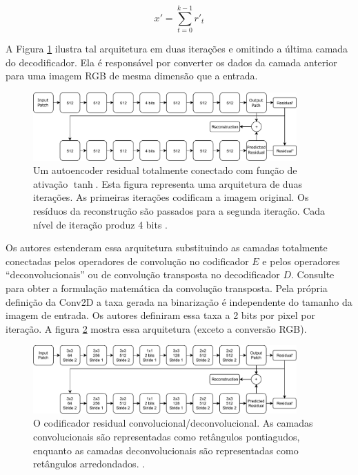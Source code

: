 \begin{equation}
x' = \sum_{t=0}^{k-1} r'_{t}
\end{equation}


A Figura  \ref{fig:toderici1} ilustra tal arquitetura em duas iterações e omitindo a última camada do decodificador. Ela é responsável por converter os dados da camada anterior para uma imagem RGB de mesma dimensão que a entrada.




\begin{figure}[h]
	\centering
	\includegraphics[width=0.90\textwidth]{figuras/toderici_1.pdf}
	\caption{Um autoencoder residual totalmente conectado com  função de ativação $\tanh$. Esta figura representa uma arquitetura de duas iterações. As primeiras iterações codificam a imagem original. Os resíduos da reconstrução são passados para a segunda iteração. Cada nível de iteração produz 4 bits \cite{Variable2016Toderici}.}
	\label{fig:toderici1}
\end{figure}


Os autores estenderam essa arquitetura substituindo as camadas totalmente conectadas pelos operadores de convolução no codificador $E$ e pelos operadores ``deconvolucionais'' ou de convolução transposta no decodificador $D$. Consulte \cite{Variable2016Toderici} para obter a formulação matemática da convolução transposta. Pela própria definição da Conv2D a taxa gerada na binarização é independente do tamanho da imagem de entrada. Os autores definiram essa taxa a 2 bits por pixel por iteração. A figura \ref{fig:toderici2} mostra essa arquitetura (exceto a conversão RGB). 


\begin{figure}[h]
	\centering
	\includegraphics[width=0.90\textwidth]{figuras/toderici_2.pdf}
	\caption{O codificador residual convolucional/deconvolucional. As camadas
		convolucionais são representadas como retângulos pontiagudos, enquanto as
		camadas deconvolucionais são representadas como retângulos arredondados. \cite{Variable2016Toderici}.}
	\label{fig:toderici2}
\end{figure}

